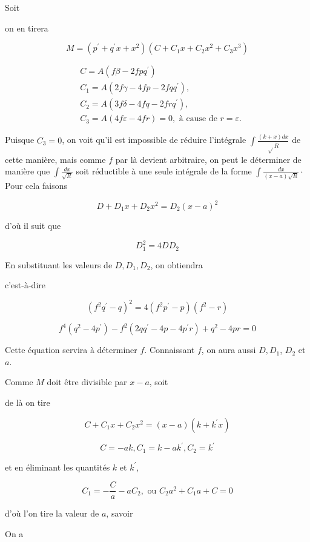 \documentclass{article}
\begin{document}
Soit

on en tirera

\[
M=\left(p^{\prime}+q^{\prime} x+x^{2}\right)\left(C+C_{1} x+C_{2} x^{2}+C_{3} x^{3}\right)
\]

\[
\begin{aligned}
& C=A\left(f \beta-2 f p q^{\prime}\right) \\
& C_{1}=A\left(2 f \gamma-4 f p-2 f q q^{\prime}\right), \\
& C_{2}=A\left(3 f \delta-4 f q-2 f r q^{\prime}\right), \\
& C_{3}=A(4 f \varepsilon-4 f r)=0, \text { à cause de } r=\varepsilon .
\end{aligned}
\]

Puisque \(C_{3}=0\), on voit qu'il est impossible de réduire l'intégrale \(\int \frac{(k+x) d x}{\sqrt{ } \dot{R}}\) de cette manière, mais comme \(f\) par là devient arbitraire, on peut le déterminer de manière que \(\int \frac{d x}{\sqrt{R}}\) soit réductible à une seule intégrale de la forme \(\int \frac{d x}{(x-a) \sqrt{R}} \cdot\) Pour cela faisons

\[
D+D_{1} x+D_{2} x^{2}=D_{2}(x-a)^{2}
\]

d'où il suit que

\[
D_{1}^{2}=4 D D_{2}
\]

En substituant les valeurs de \(D, D_{1}, D_{2}\), on obtiendra

c'est-à-dire

\[
\left(f^{2} q^{\prime}-q\right)^{2}=4\left(f^{2} p^{\prime}-p\right)\left(f^{2}-r\right)
\]

\[
f^{4}\left(q^{2}-4 p^{\prime}\right)-f^{2}\left(2 q q^{\prime}-4 p-4 p^{\prime} r\right)+q^{2}-4 p r=0
\]

Cette équation servira à déterminer \(f\). Connaissant \(f\), on aura aussi \(D, D_{1}\), \(D_{2}\) et \(a\).

Comme \(M\) doit être divisible par \(x-a\), soit

de là on tire

\[
C+C_{1} x+C_{2} x^{2}=(x-a)\left(k+k^{\prime} x\right)
\]

\[
C=-a k, C_{1}=k-a k^{\prime}, C_{2}=k^{\prime}
\]

et en éliminant les quantités \(k\) et \(k^{\prime}\),

\[
C_{1}=-\frac{C}{a}-a C_{2}, \text { ou } C_{2} a^{2}+C_{1} a+C=0
\]

d'où l'on tire la valeur de \(a\), savoir

On a
\end{document}

